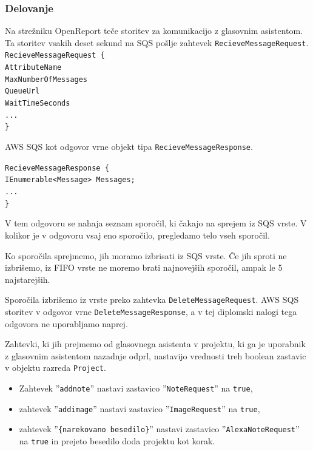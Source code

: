 \documentclass[a4paper, 12pt]{book}
\begin{document}
\subsubsection{Delovanje}

Na strežniku OpenReport teče storitev za komunikacijo z glasovnim asistentom.
Ta storitev vsakih deset sekund na SQS pošlje zahtevek \texttt{RecieveMessageRequest}.
\noindent\texttt{RecieveMessageRequest \{ \\
AttributeName \\ %
MaxNumberOfMessages \\ %
QueueUrl \\ %
WaitTimeSeconds \\ %
... \\
\} 
}

AWS SQS kot odgovor vrne objekt tipa \texttt{RecieveMessageResponse}.

\noindent\texttt{RecieveMessageResponse \{ \\
IEnumerable<Message> Messages;\\
... \\
\} }

V tem odgovoru se nahaja seznam sporočil, ki čakajo na sprejem iz SQS vrste.
V kolikor je v odgovoru vsaj eno sporočilo, pregledamo telo vseh sporočil. 

Ko sporočila sprejmemo, jih moramo izbrisati iz SQS vrste.
Če jih sproti ne izbrišemo, iz FIFO vrste ne moremo brati najnovejših sporočil, ampak le 5 najstarejših.

Sporočila izbrišemo iz vrste preko zahtevka \texttt{DeleteMessageRequest}.
AWS SQS storitev v odgovor vrne \texttt{DeleteMessageResponse}, a v tej diplomski nalogi tega odgovora ne uporabljamo naprej.

Zahtevki, ki jih prejmemo od glasovnega asistenta v projektu, ki ga je uporabnik z glasovnim asistentom nazadnje odprl, nastavijo vrednosti treh boolean zastavic v objektu razreda \texttt{Project}.
\begin{itemize}
	\item Zahtevek ''\texttt{addnote}'' nastavi zastavico ''\texttt{NoteRequest}'' na \texttt{true},
	\item zahtevek ''\texttt{addimage}'' nastavi zastavico ''\texttt{ImageRequest}'' na \texttt{true},
	\item zahtevek ''\texttt{\{narekovano besedilo\}}'' nastavi zastavico ''\texttt{AlexaNoteRequest}'' na \texttt{true} in prejeto besedilo doda projektu kot korak.
\end{itemize}
\end{document}
